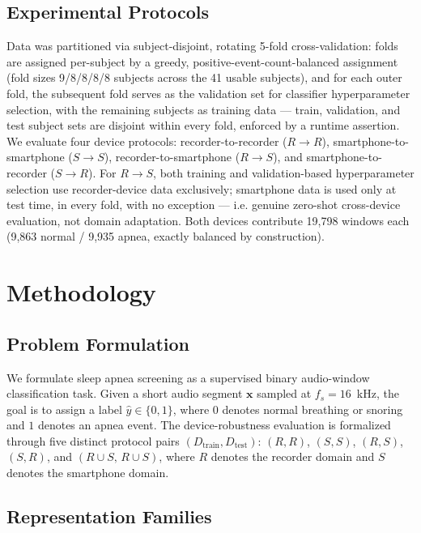 \documentclass[conference]{IEEEtran}
\begin{document}
\subsection{Experimental Protocols}

Data was partitioned via subject-disjoint, rotating 5-fold cross-validation: folds are assigned per-subject by a greedy, positive-event-count-balanced assignment (fold sizes 9/8/8/8/8 subjects across the 41 usable subjects), and for each outer fold, the subsequent fold serves as the validation set for classifier hyperparameter selection, with the remaining subjects as training data --- train, validation, and test subject sets are disjoint within every fold, enforced by a runtime assertion. We evaluate four device protocols: recorder-to-recorder ($R\rightarrow R$), smartphone-to-smartphone ($S\rightarrow S$), recorder-to-smartphone ($R\rightarrow S$), and smartphone-to-recorder ($S\rightarrow R$). For $R\rightarrow S$, both training and validation-based hyperparameter selection use recorder-device data exclusively; smartphone data is used only at test time, in every fold, with no exception --- i.e. genuine zero-shot cross-device evaluation, not domain adaptation. Both devices contribute 19,798 windows each (9,863 normal / 9,935 apnea, exactly balanced by construction).
\section{Methodology}

\subsection{Problem Formulation}

We formulate sleep apnea screening as a supervised binary audio-window classification
task. Given a short audio segment $\mathbf{x}$ sampled at $f_s = 16$~kHz, the goal is to assign a label
$\hat{y} \in \{0, 1\}$, where $0$ denotes normal breathing or snoring and $1$ denotes
an apnea event. The device-robustness evaluation is formalized through five distinct
protocol pairs $(D_{\text{train}}, D_{\text{test}})$: $(R, R)$, $(S, S)$,
$(R, S)$, $(S, R)$, and $(R \cup S,\, R \cup S)$, where $R$ denotes the recorder
domain and $S$ denotes the smartphone domain.

\subsection{Representation Families}
\end{document}
